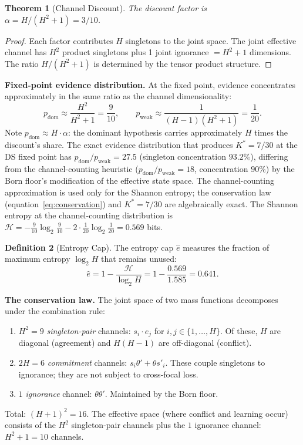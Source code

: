 \documentclass[11pt,a4paper]{article}
\newtheorem{theorem}{Theorem}[section]
\theoremstyle{definition}
\newtheorem{definition}[theorem]{Definition}
\theoremstyle{remark}
\begin{document}
\begin{theorem}[Channel Discount]\label{thm:discount}
The discount factor is $\alpha=H/(H^2+1)=3/10$.
\end{theorem}

\begin{proof}
Each factor contributes $H$ singletons to the joint space. The joint effective channel has $H^2$ product singletons plus 1 joint ignorance $=H^2+1$ dimensions. The ratio $H/(H^2+1)$ is determined by the tensor product structure.
\end{proof}

\textbf{Fixed-point evidence distribution.} At the fixed point, evidence concentrates approximately in the same ratio as the channel dimensionality:
\begin{equation}\label{eq:fpd}
p_{\mathrm{dom}}\approx\frac{H^2}{H^2+1}=\frac{9}{10},\qquad p_{\mathrm{weak}}\approx\frac{1}{(H-1)(H^2+1)}=\frac{1}{20}.
\end{equation}
Note $p_{\mathrm{dom}}\approx H\cdot\alpha$: the dominant hypothesis carries approximately $H$ times the discount's share. The exact evidence distribution that produces $K^*=7/30$ at the DS fixed point has $p_{\mathrm{dom}}/p_{\mathrm{weak}}=27.5$ (singleton concentration $93.2\%$), differing from the channel-counting heuristic ($p_{\mathrm{dom}}/p_{\mathrm{weak}}=18$, concentration $90\%$) by the Born floor's modification of the effective state space. The channel-counting approximation is used only for the Shannon entropy; the conservation law (equation~\ref{eq:conservation}) and $K^*=7/30$ are algebraically exact. The Shannon entropy at the channel-counting distribution is $\mathcal{H}=-\frac{9}{10}\log_2\frac{9}{10}-2\cdot\frac{1}{20}\log_2\frac{1}{20}=0.569$ bits.

\begin{definition}[Entropy Cap]\label{def:entcap}
The entropy cap $\hat{e}$ measures the fraction of maximum entropy $\log_2 H$ that remains unused:
\begin{equation}\label{eq:entcap}
\hat{e}=1-\frac{\mathcal{H}}{\log_2 H}=1-\frac{0.569}{1.585}=0.641.
\end{equation}
\end{definition}

\textbf{The conservation law.} The joint space of two mass functions decomposes under the combination rule:
\begin{enumerate}[nosep]
\item $H^2=9$ \emph{singleton-pair} channels: $s_i\cdot e_j$ for $i,j\in\{1,\ldots,H\}$. Of these, $H$ are diagonal (agreement) and $H(H-1)$ are off-diagonal (conflict).
\item $2H=6$ \emph{commitment} channels: $s_i\theta'+\theta s'_i$. These couple singletons to ignorance; they are not subject to cross-focal loss.
\item $1$ \emph{ignorance} channel: $\theta\theta'$. Maintained by the Born floor.
\end{enumerate}
Total: $(H+1)^2=16$. The effective space (where conflict and learning occur) consists of the $H^2$ singleton-pair channels plus the $1$ ignorance channel: $H^2+1=10$ channels.
\end{document}
